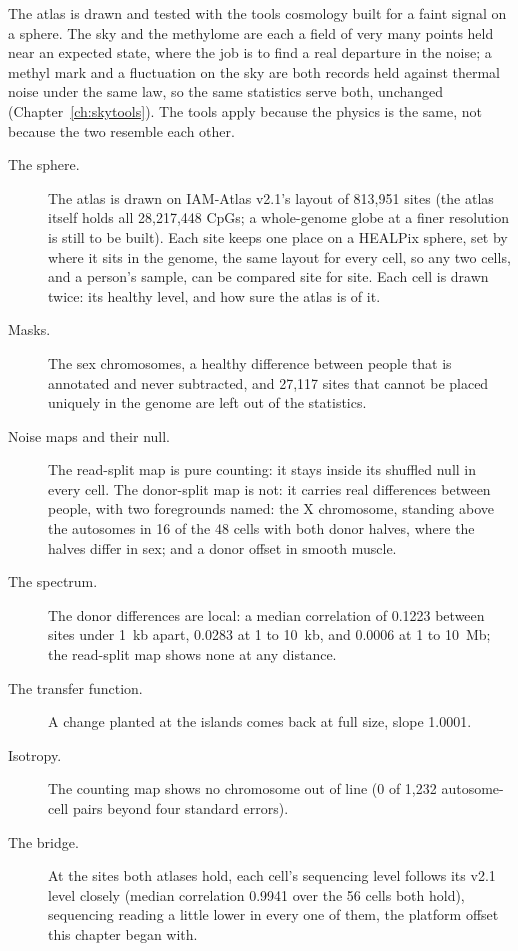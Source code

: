 The atlas is drawn and tested with the tools cosmology built for a faint signal on a sphere. The sky and the methylome are each a field of very many points held near an expected state, where the job is to find a real departure in the noise; a methyl mark and a fluctuation on the sky are both records held against thermal noise under the same law, so the same statistics serve both, unchanged (Chapter~\ref{ch:skytools}). The tools apply because the physics is the same, not because the two resemble each other.
\begin{description}
\item[The sphere.] The atlas is drawn on IAM-Atlas v2.1's layout of 813{,}951 sites (the atlas itself holds all 28{,}217{,}448 CpGs; a whole-genome globe at a finer resolution is still to be built). Each site keeps one place on a HEALPix sphere, set by where it sits in the genome, the same layout for every cell, so any two cells, and a person's sample, can be compared site for site. Each cell is drawn twice: its healthy level, and how sure the atlas is of it.
\item[Masks.] The sex chromosomes, a healthy difference between people that is annotated and never subtracted, and 27,117 sites that cannot be placed uniquely in the genome are left out of the statistics.
\item[Noise maps and their null.] The read-split map is pure counting: it stays inside its shuffled null in every cell. The donor-split map is not: it carries real differences between people, with two foregrounds named: the X chromosome, standing above the autosomes in 16 of the 48 cells with both donor halves, where the halves differ in sex; and a donor offset in smooth muscle.
\item[The spectrum.] The donor differences are local: a median correlation of 0.1223 between sites under 1~kb apart, 0.0283 at 1 to 10~kb, and 0.0006 at 1 to 10~Mb; the read-split map shows none at any distance.
\item[The transfer function.] A change planted at the islands comes back at full size, slope 1.0001.
\item[Isotropy.] The counting map shows no chromosome out of line (0 of 1,232 autosome-cell pairs beyond four standard errors).
\item[The bridge.] At the sites both atlases hold, each cell's sequencing level follows its v2.1 level closely (median correlation 0.9941 over the 56 cells both hold), sequencing reading a little lower in every one of them, the platform offset this chapter began with.
\end{description}
